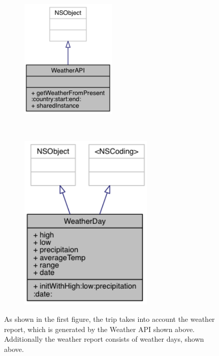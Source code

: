 \documentclass[11pt]{article}
\begin{document}
    \begin{figure}
        \centering
        \begin{subfigure}[t]{0.45\textwidth}
            \centering
            \includegraphics[width=0.5\textwidth]{img/interface_weather_api.png}
        \end{subfigure}%
        ~ 
        \begin{subfigure}[t]{0.45\textwidth} 
            \centering
            \includegraphics[width=0.7\textwidth]{img/interface_weather_day.png}
        \end{subfigure}
        \caption{As shown in the first figure, the trip takes into account the weather report, which is generated by the Weather API shown above. Additionally the weather report consists of weather days, shown above.}
        \label{fig:weather-api}
    \end{figure}
\end{document}
